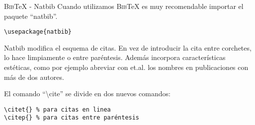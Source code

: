 \documentclass[11pt]{beamer}
\newcommand{\BibTeX}{\textsc{Bib}\TeX{}}
\begin{document}
\begin{frame}[fragile]{\BibTeX{} - Natbib}
Cuando utilizamos \BibTeX{} es muy recomendable importar el paquete ``natbib''.

{\color{new_green} \scriptsize
\begin{verbatim}
\usepackage{natbib}
\end{verbatim}
}

Natbib modifica el esquema de citas. En vez de introducir la cita entre corchetes, lo hace limpiamente o entre paréntesis. Además incorpora características estéticas, como por ejemplo abreviar con et.al. los nombres en publicaciones con más de dos autores.

El comando ``\textbackslash cite{}'' se divide en dos nuevos comandos:
{\color{new_green} \scriptsize
\begin{verbatim}
\citet{} % para citas en linea
\citep{} % para citas entre paréntesis
\end{verbatim}
}

\end{frame}
\end{document}
